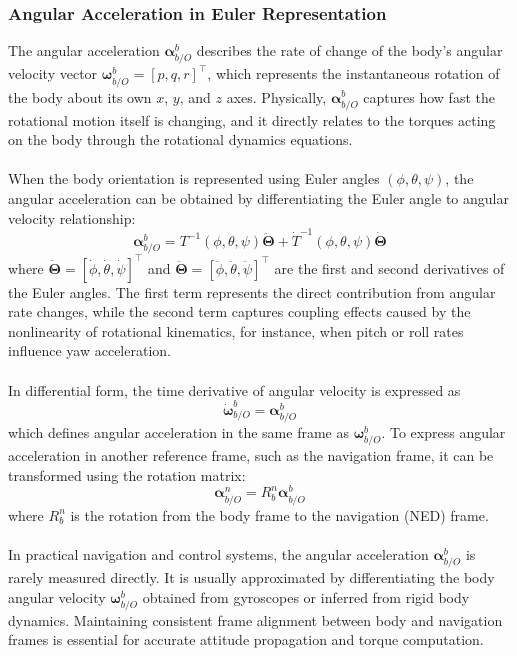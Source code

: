 \subsubsection{Angular Acceleration in Euler Representation}
The angular acceleration $\boldsymbol{\alpha}_{b/O}^{b}$ describes the rate of change of the body's angular velocity vector $\boldsymbol{\omega}_{b/O}^{b} = [p, q, r]^\top$, which represents the instantaneous rotation of the body about its own $x$, $y$, and $z$ axes. Physically, $\boldsymbol{\alpha}_{b/O}^{b}$ captures how fast the rotational motion itself is changing, and it directly relates to the torques acting on the body through the rotational dynamics equations.  
\\ \\
When the body orientation is represented using Euler angles $(\phi, \theta, \psi)$, the angular acceleration can be obtained by differentiating the Euler angle to angular velocity relationship:
$$
    \boldsymbol{\alpha}_{b/O}^{b} = T^{-1}(\phi, \theta, \psi)\ddot{\boldsymbol{\Theta}} + \dot{T}^{-1}(\phi, \theta, \psi)\dot{\boldsymbol{\Theta}}
$$
where $\dot{\boldsymbol{\Theta}} = [\dot{\phi}, \dot{\theta}, \dot{\psi}]^\top$ and $\ddot{\boldsymbol{\Theta}} = [\ddot{\phi}, \ddot{\theta}, \ddot{\psi}]^\top$ are the first and second derivatives of the Euler angles. The first term represents the direct contribution from angular rate changes, while the second term captures coupling effects caused by the nonlinearity of rotational kinematics, for instance, when pitch or roll rates influence yaw acceleration.  
\\ \\
In differential form, the time derivative of angular velocity is expressed as
$$
    \dot{\boldsymbol{\omega}}_{b/O}^{b} = \boldsymbol{\alpha}_{b/O}^{b}
$$
which defines angular acceleration in the same frame as $\boldsymbol{\omega}_{b/O}^{b}$. To express angular acceleration in another reference frame, such as the navigation frame, it can be transformed using the rotation matrix:
$$
    \boldsymbol{\alpha}_{b/O}^{n} = R_b^n \boldsymbol{\alpha}_{b/O}^{b}
$$
where $R_b^n$ is the rotation from the body frame to the navigation (NED) frame.  
\\ \\
In practical navigation and control systems, the angular acceleration $\boldsymbol{\alpha}_{b/O}^{b}$ is rarely measured directly. It is usually approximated by differentiating the body angular velocity $\boldsymbol{\omega}_{b/O}^{b}$ obtained from gyroscopes or inferred from rigid body dynamics. Maintaining consistent frame alignment between body and navigation frames is essential for accurate attitude propagation and torque computation.



